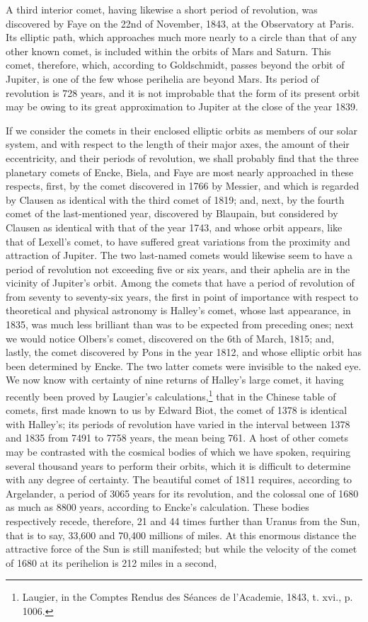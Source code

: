 A third interior comet, having likewise a short period of revolution, was discovered by Faye on the 22nd of November, 1843, at the Observatory at Paris. Its elliptic path, which approaches much more nearly to a circle than that of any other known comet, is included within the orbits of Mars and Saturn. This comet, therefore, which, according to Goldschmidt, passes beyond the orbit of Jupiter, is one of the few whose perihelia are beyond Mars. Its period of revolution is 728 years, and it is not improbable that the form of its present orbit may be owing to its great approximation to Jupiter at the close of the year 1839.

If we consider the comets in their enclosed elliptic orbits as members of our solar system, and with respect to the length of their major axes, the amount of their eccentricity, and their periods of revolution, we shall probably find that the three planetary comets of Encke, Biela, and Faye are most nearly approached in these respects, first, by the comet discovered in 1766 by Messier, and which is regarded by Clausen as identical with the third comet of 1819; and, next, by the fourth comet of the last-mentioned year, discovered by Blaupain, but considered by Clausen as identical with that of the year 1743, and whose orbit appears, like that of Lexell's comet, to have suffered great variations from the proximity and attraction of Jupiter. The two last-named comets would likewise seem to have a period of revolution not exceeding five or six years, and their aphelia are in the vicinity of Jupiter's orbit. Among the comets that have a period of revolution of from seventy to seventy-six years, the first in point of importance with respect to theoretical and physical astronomy is Halley's comet, whose last appearance, in 1835, was much less brilliant than was to be expected from preceding ones; next we would notice Olbers's comet, discovered on the 6th of March, 1815; and, lastly, the comet discovered by Pons in the year 1812, and whose elliptic orbit has been determined by Encke. The two latter comets were invisible to the naked eye. We now know with certainty of nine returns of Halley's large comet, it having recently been proved by Laugier's calculations,\footnote{Laugier, in the Comptes Rendus des S\'{e}ances de l'Academie, 1843, t. xvi., p. 1006.} that in the Chinese table of comets, first made known to us by Edward Biot, the comet of 1378 is identical with Halley's; its periods of revolution have varied in the interval between 1378 and 1835 from 7491 to 7758 years, the mean being 761. A host of other comets may be contrasted with the cosmical bodies of which we have spoken, requiring several thousand years to perform their orbits, which it is difficult to determine with any degree of certainty. The beautiful comet of 1811 requires, according to Argelander, a period of 3065 years for its revolution, and the colossal one of 1680 as much as 8800 years, according to Encke's calculation. These bodies respectively recede, therefore, 21 and 44 times further than Uranus from the Sun, that is to say, 33,600 and 70,400 millions of miles. At this enormous distance the attractive force of the Sun is still manifested; but while the velocity of the comet of 1680 at its perihelion is 212 miles in a second, 